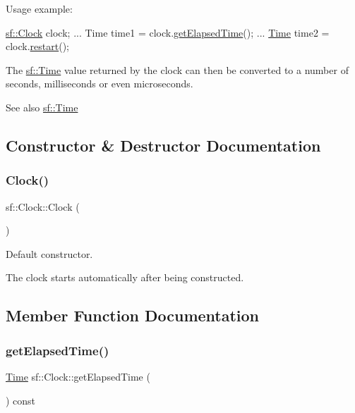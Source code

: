 Usage example\+: 
\begin{DoxyCode}
\hyperlink{classsf_1_1_clock}{sf::Clock} clock;
...
Time time1 = clock.\hyperlink{classsf_1_1_clock_abe889b42a65bcd8eefc16419645d08a7}{getElapsedTime}();
...
\hyperlink{classsf_1_1_time_acba0cfbc49e3a09a22a8e079eb67a05c}{Time} time2 = clock.\hyperlink{classsf_1_1_clock_a123e2627f2943e5ecaa1db0c7df3231b}{restart}();
\end{DoxyCode}


The \hyperlink{classsf_1_1_time}{sf\+::\+Time} value returned by the clock can then be converted to a number of seconds, milliseconds or even microseconds.

\begin{DoxySeeAlso}{See also}
\hyperlink{classsf_1_1_time}{sf\+::\+Time} 
\end{DoxySeeAlso}


\subsection{Constructor \& Destructor Documentation}
\mbox{\label{classsf_1_1_clock_abbc959c7830ca7c3a4da133cb506d3fd}} 
\subsubsection{\texorpdfstring{Clock()}{Clock()}}
{\footnotesize\ttfamily sf\+::\+Clock\+::\+Clock (\begin{DoxyParamCaption}{ }\end{DoxyParamCaption})}



Default constructor. 

The clock starts automatically after being constructed. 

\subsection{Member Function Documentation}
\mbox{\label{classsf_1_1_clock_abe889b42a65bcd8eefc16419645d08a7}} 
\subsubsection{\texorpdfstring{get\+Elapsed\+Time()}{getElapsedTime()}}
{\footnotesize\ttfamily \hyperlink{classsf_1_1_time}{Time} sf\+::\+Clock\+::get\+Elapsed\+Time (\begin{DoxyParamCaption}{ }\end{DoxyParamCaption}) const}



